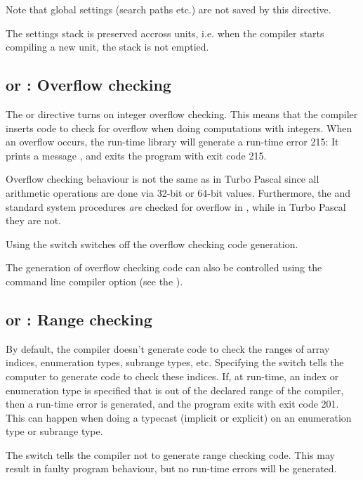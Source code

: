 Note that global settings (search paths etc.) are not saved by this 
directive.

The settings stack is preserved accross units, i.e. when the compiler starts
compiling a new unit, the stack is not emptied.

\subsection{ or : Overflow checking}
The  or  directive turns on
integer overflow checking. This means that the compiler inserts code
to check for overflow when doing computations with integers.
When an overflow occurs, the run-time library will generate a run-time error
215: It prints a message , and exits the program with exit code 215.

\begin{remark}Overflow checking behaviour is not the same as in
Turbo Pascal since all arithmetic operations are done via 32-bit or
64-bit values. Furthermore, the  and  standard system
procedures {\em are} checked for overflow in \fpc, while in Turbo
Pascal they are not.
\end{remark}
Using the  switch switches off the overflow checking code
generation.

The generation of overflow checking code can also be controlled
using the  command line compiler option (see the \userref).

\subsection{ or  : Range checking}

By default, the compiler doesn't generate code to check the ranges of array
indices, enumeration types, subrange types, etc. Specifying the
 switch tells the computer to generate code to check these
indices. If, at run-time, an index or enumeration type is specified that is
out of the declared range of the compiler, then a run-time error is
generated, and the program exits with exit code 201. This can happen when
doing a typecast (implicit or explicit) on an enumeration type or subrange
type.

The  switch tells the compiler not to generate range checking
code. This may result in faulty program behaviour, but no run-time errors
will be generated.

